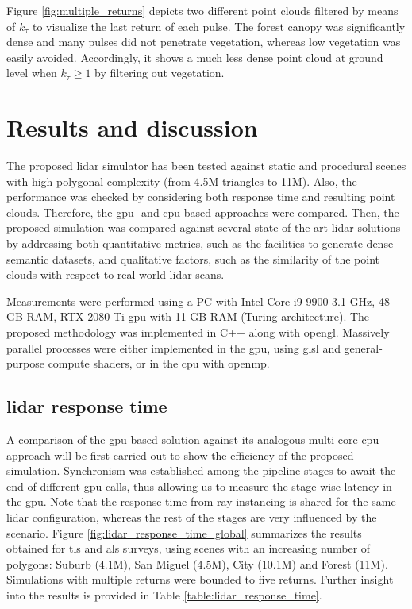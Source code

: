 Figure \ref{fig:multiple_returns} depicts two different point clouds filtered by means of $k_{\tau}$ to visualize the last return of each pulse. The forest canopy was significantly dense and many pulses did not penetrate vegetation, whereas low vegetation was easily avoided. Accordingly, it shows a much less dense point cloud at ground level when $k_{\tau} \geq 1$ by filtering out vegetation.

\section{Results and discussion}

The proposed \acrshort{lidar} simulator has been tested against static and procedural scenes with high polygonal complexity (from 4.5M triangles to 11M). Also, the performance was checked by considering both response time and resulting point clouds. Therefore, the \acrshort{gpu}- and \acrshort{cpu}-based approaches were compared. Then, the proposed simulation was compared against several state-of-the-art \acrshort{lidar} solutions by addressing both quantitative metrics, such as the facilities to generate dense semantic datasets, and qualitative factors, such as the similarity of the point clouds with respect to real-world \acrshort{lidar} scans. 

Measurements were performed using a PC with Intel Core i9-9900 3.1 GHz, 48 GB RAM, RTX 2080 Ti \acrshort{gpu} with 11 GB RAM (Turing architecture). The proposed methodology was implemented in C++ along with \acrshort{opengl}. Massively parallel processes were either implemented in the \acrshort{gpu}, using \acrshort{glsl} and general-purpose compute shaders, or in the \acrshort{cpu} with \acrshort{openmp}. 

\subsection{\acrshort{lidar} response time}

A comparison of the \acrshort{gpu}-based solution against its analogous multi-core \acrshort{cpu} approach will be first carried out to show the efficiency of the proposed simulation. Synchronism was established among the pipeline stages to await the end of different \acrshort{gpu} calls, thus allowing us to measure the stage-wise latency in the \acrshort{gpu}. Note that the response time from ray instancing is shared for the same \acrshort{lidar} configuration, whereas the rest of the stages are very influenced by the scenario. Figure \ref{fig:lidar_response_time_global} summarizes the results obtained for \acrshort{tls} and \acrshort{als} surveys, using scenes with an increasing number of polygons: Suburb (4.1M), San Miguel (4.5M), City (10.1M) and Forest (11M). Simulations with multiple returns were bounded to five returns. Further insight into the results is provided in Table \ref{table:lidar_response_time}.

